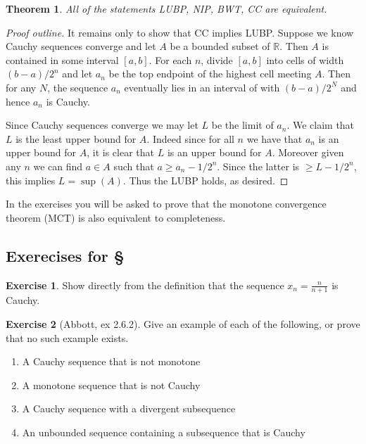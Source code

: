 \documentclass[11pt,oneside]{amsbook}
\newcommand{\R}{\mathbb R}
\theoremstyle{definition}
\newtheorem{exerc}{Exercise}[section]
\theoremstyle{plain}
\newtheorem{theorem}{Theorem}[section]
\theoremstyle{definition}
\theoremstyle{remark}
\numberwithin{equation}{section}
\numberwithin{figure}{section}
\begin{document}
\begin{theorem}
  All of the statements LUBP, NIP, BWT, CC are equivalent.
\end{theorem}

\begin{proof}[Proof outline]
  It remains only to show that CC implies LUBP. Suppose we know Cauchy sequences converge and let $A$ be a bounded subset of $\R$. Then $A$ is contained in some interval $[a,b]$. For each $n$, divide $[a,b]$ into cells of width $(b-a)/2^n$ and let $a_n$ be the top endpoint of the highest cell meeting $A$. Then for any $N$, the sequence $a_n$ eventually lies in an interval of with $(b-a)/2^N$ and hence $a_n$ is Cauchy.

  Since Cauchy sequences converge we may let $L$ be the limit of $a_n$. We claim that $L$ is the least upper bound for $A$. Indeed since for all $n$ we have that $a_n$ is an upper bound for $A$, it is clear that $L$ is an upper bound for $A$. Moreover given any $n$ we can find $a\in A$ such that $a\geq a_n-1/2^n$. Since the latter is $\geq L-1/2^n$, this implies $L=\sup(A)$. Thus the LUBP holds, as desired.
\end{proof}

In the exercises you will be asked to prove that the monotone convergence theorem (MCT) is also equivalent to completeness.

\newpage
\subsection*{Exerecises for \S \thesection}

\begin{exerc}
  Show directly from the definition that the sequence $x_n=\frac{n}{n+1}$ is Cauchy.
\end{exerc}

\begin{exerc}[Abbott, ex 2.6.2]
  Give an example of each of the following, or prove that no such example exists.
  \begin{enumerate}
    \item A Cauchy sequence that is not monotone
    \item A monotone sequence that is not Cauchy
    \item A Cauchy sequence with a divergent subsequence
    \item An unbounded sequence containing a subsequence that is Cauchy
  \end{enumerate}
\end{exerc}
\end{document}
